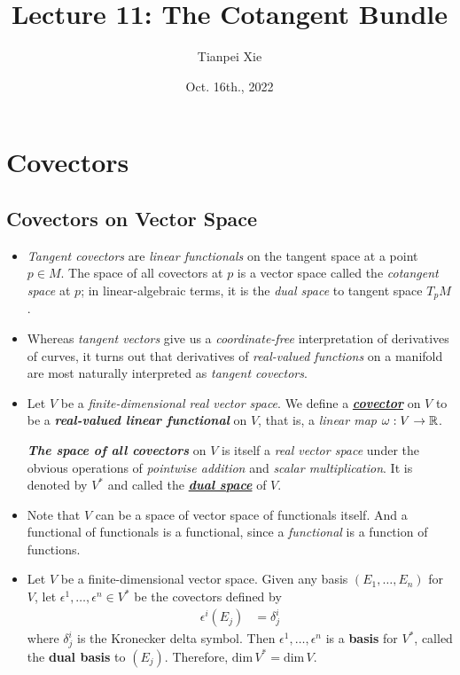 \documentclass[11pt]{article}
\begin{document}
\title{Lecture 11: The Cotangent Bundle}
\author{ Tianpei Xie}
\date{Oct. 16th., 2022}
\maketitle
\tableofcontents
\newpage
\section{Covectors}
\subsection{Covectors on Vector Space}
\begin{itemize}
\item \emph{Tangent covectors} are \emph{linear functionals} on the tangent space at a point $p \in M$.  The space of all covectors at $p$ is a vector space called the \emph{cotangent space} at $p$; in linear-algebraic terms, it is the \emph{dual space} to tangent space $T_{p}M$. \citep{lee2003introduction}

\item Whereas \emph{tangent vectors} give us a \emph{coordinate-free} interpretation of derivatives of curves, it turns out that derivatives of \emph{real-valued functions} on a manifold are most naturally interpreted as \emph{tangent covectors}.

\item \begin{definition}
Let $V$ be a \emph{finite-dimensional real vector space}. We define a \underline{\emph{\textbf{covector}}} on $V$ to be a \textbf{\emph{real-valued linear functional}} on $V$, that is, a \emph{linear map} $\omega: V \rightarrow {\mathbb R}$.

\emph{\textbf{The space of all covectors}} on $V$ is itself a \emph{real vector space} under the obvious operations of \emph{pointwise addition} and \emph{scalar multiplication}. It is denoted by $V^{*}$ and called the \underline{\emph{\textbf{dual space}}} of $V$.
\end{definition}

\item Note that $V$ can be a space of vector space of functionals itself. And a functional of functionals is a functional, since a \emph{functional} is a function of functions.

\item \begin{proposition}
Let $V$ be a finite-dimensional vector space. Given any basis $(E_1,\ldots, E_n)$ for $V$, let $\epsilon^1, \ldots, \epsilon^n \in V^{*}$ be the covectors defined by 
\begin{align*}
\epsilon^{i}(E_{j}) &= \delta_{j}^{i}
\end{align*}
where $\delta_{j}^{i}$ is the Kronecker delta symbol. Then $\epsilon^1, \ldots, \epsilon^n$ is a \textbf{basis} for $V^{*}$, called the \textbf{dual basis} to $(E_j)$. Therefore, $\text{dim}\,V^{*} = \text{dim}\,V$.
\end{proposition}


\end{itemize}
\end{document}
